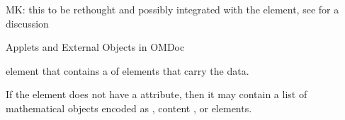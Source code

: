 \begin{module}[id=ext]
\begin{omgroup}[id=ext,short=Auxiliary Elements]
\begin{oldpart}{MK: this to be rethought and possibly integrated with the
    {} element, see  for a discussion}
\begin{omgroup}[id=applets]{Applets and External Objects in OMDoc}
\begin{definition}[id=parameter.def]
\begin{description}
  {} element that contains a {} of
  {} elements that carry the data.
\end{description}
If the {} element does not have a {} attribute,
then it may contain a list of mathematical objects encoded as {\openmath}, content
{\mathml}, or {} elements.
\end{definition}
\end{omgroup}
\end{oldpart}
\end{omgroup}
\end{module}


